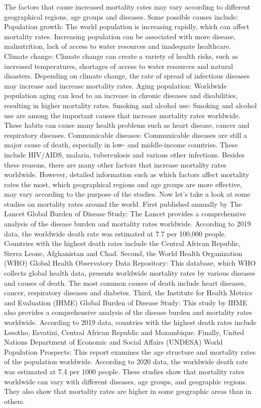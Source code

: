 \documentclass[
  12pt,
]{article}
\begin{document}
The factors that cause increased mortality rates may vary according to different geographical regions, age groups and diseases. Some possible causes include: Population growth: The world population is increasing rapidly, which can affect mortality rates. Increasing population can be associated with more disease, malnutrition, lack of access to water resources and inadequate healthcare. Climate change: Climate change can create a variety of health risks, such as increased temperatures, shortages of access to water resources and natural disasters. Depending on climate change, the rate of spread of infectious diseases may increase and increase mortality rates. Aging population: Worldwide population aging can lead to an increase in chronic diseases and disabilities, resulting in higher mortality rates. Smoking and alcohol use: Smoking and alcohol use are among the important causes that increase mortality rates worldwide. These habits can cause many health problems such as heart disease, cancer and respiratory diseases. Communicable diseases: Communicable diseases are still a major cause of death, especially in low- and middle-income countries. These include HIV/AIDS, malaria, tuberculosis and various other infections. Besides these reasons, there are many other factors that increase mortality rates worldwide. However, detailed information such as which factors affect mortality rates the most, which geographical regions and age groups are more effective, may vary according to the purpose of the studies. Now let's take a look at some studies on mortality rates around the world. First published annually by The Lancet Global Burden of Disease Study: The Lancet provides a comprehensive analysis of the disease burden and mortality rates worldwide. According to 2019 data, the worldwide death rate was estimated at 7.7 per 100,000 people. Countries with the highest death rates include the Central African Republic, Sierra Leone, Afghanistan and Chad. Second, the World Health Organization (WHO) Global Health Observatory Data Repository: This database, which WHO collects global health data, presents worldwide mortality rates by various diseases and causes of death. The most common causes of death include heart diseases, cancer, respiratory diseases and diabetes. Third, the Institute for Health Metrics and Evaluation (IHME) Global Burden of Disease Study: This study by IHME also provides a comprehensive analysis of the disease burden and mortality rates worldwide. According to 2019 data, countries with the highest death rates include Lesotho, Esvatini, Central African Republic and Mozambique. Finally, United Nations Department of Economic and Social Affairs (UNDESA) World Population Prospects: This report examines the age structure and mortality rates of the population worldwide. According to 2020 data, the worldwide death rate was estimated at 7.4 per 1000 people. These studies show that mortality rates worldwide can vary with different diseases, age groups, and geographic regions. They also show that mortality rates are higher in some geographic areas than in others.
\end{document}
